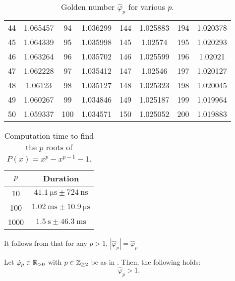 \documentclass{article}
\begin{document}
\begin{table}
\begin{tabular}{*{8}{c}}
        44 & 1.065457 & 94 & 1.036299 & 144 & 1.025883 & 194 & 1.020378 \\
        45 & 1.064339 & 95 & 1.035998 & 145 & 1.02574 & 195 & 1.020293 \\
        46 & 1.063264 & 96 & 1.035702 & 146 & 1.025599 & 196 & 1.02021 \\
        47 & 1.062228 & 97 & 1.035412 & 147 & 1.02546 & 197 & 1.020127 \\
        48 & 1.06123 & 98 & 1.035127 & 148 & 1.025323 & 198 & 1.020045 \\
        49 & 1.060267 & 99 & 1.034846 & 149 & 1.025187 & 199 & 1.019964 \\
        50 & 1.059337 & 100 & 1.034571 & 150 & 1.025052 & 200 & 1.019883 \\
        \bottomrule
      \end{tabular}
      \caption{Golden number $\hat{\varphi}_p$ for various $p$.}
    \end{table}

    \begin{table}
      \centering
      \begin{tabular}{cc}
        \toprule
        $p$ & Duration \\
        \midrule
        10 & $\SI{41.1}{\micro\second} \pm \SI{724}{\nano\second}$\\
        100 & $\SI{1.02}{\milli\second} \pm \SI{10.9}{\micro\second}$\\
        1000 & $\SI{1.5}{\second} \pm \SI{46.3}{\milli\second}$\\
        \bottomrule
      \end{tabular}
      \caption{Computation time to find the $p$ roots of $P(x) = x^p - x^{p-1} - 1$.}
    \end{table}


    \begin{remark}
      It follows from  that for any $p > 1$, $|\hat{\varphi}_p| = \hat{\varphi}_p$
    \end{remark}

    \begin{theorem} \label{thm:A-10}
      Let $\hat{\varphi}_{p} \in \mathbb{R}_{>0}$ with $p \in \mathbb{Z}_{\geq 2}$ be as in . Then, the following holds:
      \begin{equation} 
        \hat{\varphi}_p > 1.
      \end{equation}
    \end{theorem}
\end{document}
